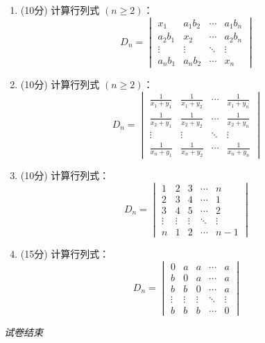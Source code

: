 \documentclass[a4paper,12pt]{article}
\begin{document}
\begin{enumerate}[leftmargin=*]
\item (10分) 计算行列式 $(n \geq 2)$：
\[
D_n = \begin{vmatrix}
x_1 & a_1b_2 & \cdots & a_1b_n \\
a_2b_1 & x_2 & \cdots & a_2b_n \\
\vdots & \vdots & \ddots & \vdots \\
a_nb_1 & a_nb_2 & \cdots & x_n
\end{vmatrix}
\]

\item (10分) 计算行列式 $(n \geq 2)$：
\[
D_n = \begin{vmatrix}
\frac{1}{x_1+y_1} & \frac{1}{x_1+y_2} & \cdots & \frac{1}{x_1+y_n} \\
\frac{1}{x_2+y_1} & \frac{1}{x_2+y_2} & \cdots & \frac{1}{x_2+y_n} \\
\vdots & \vdots & \ddots & \vdots \\
\frac{1}{x_n+y_1} & \frac{1}{x_n+y_2} & \cdots & \frac{1}{x_n+y_n}
\end{vmatrix}
\]

\item (10分) 计算行列式：
\[
D_n = \begin{vmatrix}
1 & 2 & 3 & \cdots & n \\
2 & 3 & 4 & \cdots & 1 \\
3 & 4 & 5 & \cdots & 2 \\
\vdots & \vdots & \vdots & \ddots & \vdots \\
n & 1 & 2 & \cdots & n-1
\end{vmatrix}
\]

\item (15分) 计算行列式：
\[
D_n = \begin{vmatrix}
0 & a & a & \cdots & a \\
b & 0 & a & \cdots & a \\
b & b & 0 & \cdots & a \\
\vdots & \vdots & \vdots & \ddots & \vdots \\
b & b & b & \cdots & 0
\end{vmatrix}
\]

\end{enumerate}

\vfill
\begin{center}
\textit{试卷结束}
\end{center}
\end{document}

